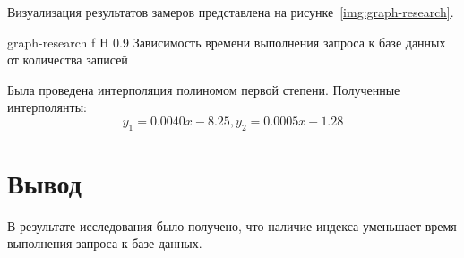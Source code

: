 Визуализация результатов замеров представлена на рисунке~\ref{img:graph-research}.

    {graph-research}
    {f}
    {H}
    {0.9\textwidth}
    {Зависимость времени выполнения запроса к базе данных от количества записей}

Была проведена интерполяция полиномом первой степени. Полученные интерполянты:
$$ y_1 = 0.0040x - 8.25, y_2 = 0.0005x - 1.28$$

\section*{Вывод}

В результате исследования было получено, что наличие индекса уменьшает время выполнения запроса к базе данных.

